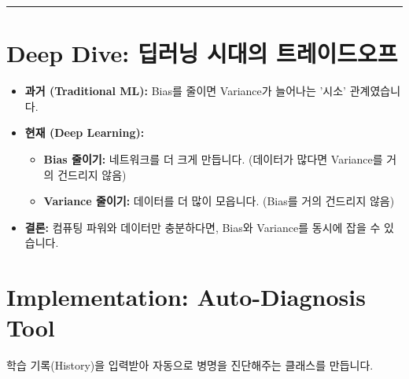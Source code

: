 \documentclass[11pt,a4paper]{book}
\theoremstyle{definition}
\begin{document}
\vspace{0.5cm}\hrule\vspace{0.5cm}

\section{Deep Dive: 딥러닝 시대의 트레이드오프}

\begin{itemize}
    \item \textbf{과거 (Traditional ML):} Bias를 줄이면 Variance가 늘어나는 '시소' 관계였습니다.
    \item \textbf{현재 (Deep Learning):}
    \begin{itemize}
        \item \textbf{Bias 줄이기:} 네트워크를 더 크게 만듭니다. (데이터가 많다면 Variance를 거의 건드리지 않음)
        \item \textbf{Variance 줄이기:} 데이터를 더 많이 모읍니다. (Bias를 거의 건드리지 않음)
    \end{itemize}
    \item \textbf{결론:} 컴퓨팅 파워와 데이터만 충분하다면, Bias와 Variance를 동시에 잡을 수 있습니다.
\end{itemize}

\section{Implementation: Auto-Diagnosis Tool}

학습 기록(History)을 입력받아 자동으로 병명을 진단해주는 클래스를 만듭니다.
\end{document}
